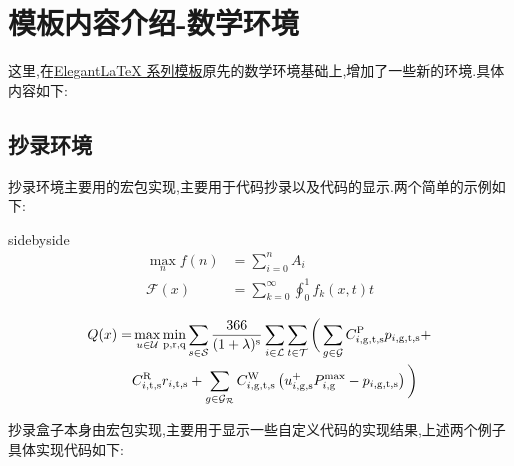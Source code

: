 \newpage

\section{模板内容介绍-数学环境}
这里,在\href{https://elegantlatex.org/}{Elegant\LaTeX{} 系列模板}原先的数学环境基础上,增加了一些新的环境.具体内容如下:

\subsection{抄录环境}
抄录环境主要用的宏包实现,主要用于代码抄录以及代码的显示.两个简单的示例如下:

\begin{tcblisting}{sidebyside}
\begin{align}
    \max_nf(n)&=\sum\nolimits_{i=0}^n A_i\\
    \mathcal{F}(x) &=\sum_{k=0}^\infty
    \oint_0^1 f_k(x,t) t
\end{align}
\end{tcblisting}

\begin{tcblisting}{}
\begin{align}\begin{aligned}
        Q(x)=&\max \limits_{u\in {\cal U}} \min\limits_\text{p,r,q}
        \sum\limits_{s\in {\cal S}} \frac{366}{(1+\lambda )^{\rm s}}\sum\limits_{i\in
            {\cal L}} \sum\limits_{t\in {\cal T}} \bigg(\sum\limits_{g\in {\cal G}}
        C_{i,\rm {g,t,s}}^{\rm P} p_{i,\rm {g,t,s}}+\\
        &C_{i,\rm {t,s}}^{\rm R} r_{i,\rm {t,s}}+
        \sum\limits_{g\in {\cal {G_{\cal R}}}}C_{i,\rm {g,t,s}}^{\rm W} \left(u_{i,\rm {g,s}}^{+}
        P_{i,\rm g}^{\max} -p_{i,\rm {g,t,s}}\right)\bigg)
\end{aligned}\end{align}
\end{tcblisting}
抄录盒子本身由宏包实现,主要用于显示一些自定义代码的实现结果,上述两个例子具体实现代码如下:

